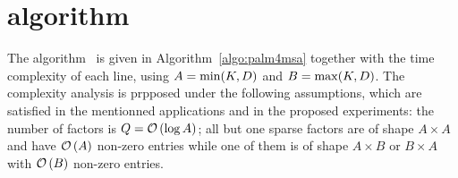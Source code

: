 \section{\palm algorithm}
\label{sec:app:palm4msa}

The \palm algorithm~\citep{LeMagoarou2016Flexible} is given in Algorithm~\ref{algo:palm4msa} together with the time complexity of each line, using $A=\min(K, D)$ and $B=\max(K, D)$. The complexity analysis is prpposed under the following assumptions, which are satisfied in the mentionned applications and in the proposed experiments: the number of factors is $Q=\mathcal{O}\left (\log A\right )$; all but one sparse factors are of shape $A \times A$ and have $\mathcal{O}\left (A\right )$ non-zero entries while one of them is of shape $A\times B$ or $B\times A$ with $\mathcal{O}\left (B\right )$ non-zero entries.


